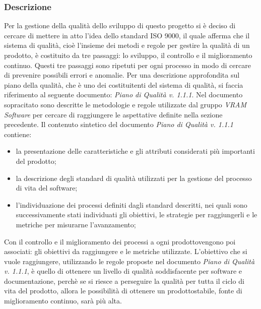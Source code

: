 \subsubsection{Descrizione}
Per la gestione della qualità dello sviluppo di questo progetto si è deciso di cercare di mettere in atto l'idea dello standard ISO 9000, il quale afferma che il sistema di qualità, cioè l'insieme dei metodi e regole per gestire la qualità di un prodotto\glo, è costituito da tre passaggi: lo sviluppo, il controllo e il miglioramento continuo. Questi tre passaggi sono ripetuti per ogni processo in modo di cercare di prevenire possibili errori e anomalie.
Per una descrizione approfondita sul piano della qualità, che è uno dei costituitenti del sistema di qualità, si faccia riferimento al seguente documento: \textit{Piano di Qualità v. 1.1.1}.
Nel documento sopracitato sono descritte le metodologie e regole utilizzate dal gruppo \textit{VRAM Software} per cercare di raggiungere le aspettative definite nella sezione precedente.
Il contenuto sintetico del documento \textit{Piano di Qualità v. 1.1.1} contiene:
\begin{itemize}
	\item la presentazione delle caratteristiche e gli attributi considerati più importanti del prodotto\glo;
	\item la descrizione degli standard di qualità utilizzati per la gestione del processo di vita del software;
	\item l'individuazione dei processi definiti dagli standard descritti, nei quali sono successivamente stati individuati gli obiettivi, le strategie per raggiungerli e le metriche per misurarne l'avanzamento;
\end{itemize}
Con il controllo e il miglioramento dei processi a ogni prodotto\glosp vengono poi associati: gli obiettivi da raggiungere e le metriche utilizzate.
L'obiettivo che si vuole raggiungere, utilizzando le regole proposte nel documento \textit{Piano di Qualità v. 1.1.1}, è quello di ottenere un livello di qualità soddisfacente per software e documentazione, perchè se si riesce a perseguire la qualità per tutta il ciclo di vita del prodotto\glo, allora le possibilità di ottenere un prodotto\glosp stabile, fonte di miglioramento continuo, sarà più alta.
